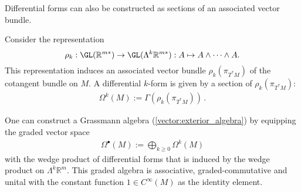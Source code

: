     Differential forms can also be constructed as sections of an associated vector bundle.
    \begin{adefinition}
        Consider the representation \[\rho_k:\GL(\mathbb{R}^{m*})\rightarrow\GL(\Lambda^k\mathbb{R}^{m*}): A\mapsto A\wedge\cdots\wedge A.\] This representation induces an associated vector bundle $\rho_k(\pi_{T^*M})$ of the cotangent bundle on $M$. A differential $k$-form is given by a section of $\rho_k(\pi_{T^*M})$:
        \begin{gather}
            \Omega^k(M) := \Gamma(\rho_k(\pi_{T^*M}))\,.
        \end{gather}
    \end{adefinition}

    \begin{construct}
        One can construct a Grassmann algebra (\cref{vector:exterior_algebra}) by equipping the graded vector space
        \begin{gather}
            \Omega^\bullet(M) := \bigoplus_{k\geq0}\Omega^k(M)
        \end{gather}
        with the wedge product of differential forms that is induced by the wedge product on $\Lambda^k\mathbb{R}^m$. This graded algebra is associative, graded-commutative and unital with the constant function $1\in C^{\infty}(M)$ as the identity element.
    \end{construct}

